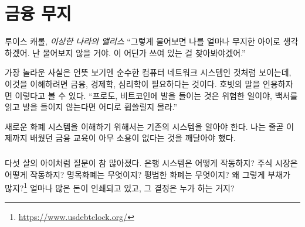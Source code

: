 \chapter{금융 무지}
\label{les:8}

\begin{chapquote}{루이스 캐롤, \textit{이상한 나라의 앨리스}}
\enquote{그렇게 물어보면 나를 얼마나 무지한 아이로 생각하겠어. 난 물어보지 않을 거야. 이 어딘가 쓰여 있는 걸 찾아봐야겠어.}
\end{chapquote}

가장 놀라운 사실은 언뜻 보기엔 순수한 컴퓨터 네트워크 시스템인 것처럼 보이는데,
이것을 이해하려면 금융, 경제학, 심리학이 필요하다는 것이다.
 호빗의 말을 인용하자면 이렇다고 볼 수 있다. 
\enquote{프로도, 비트코인에 발을 
들이는 것은 위험한 일이야, 백서를 읽고 발을 들이지 않는다면 어디로 휩쓸릴지 몰라.}

새로운 화폐 시스템을 이해하기 위해서는 기존의 시스템을 알아야 한다. 
나는 줄곧 이제까지 배웠던 금융 교육이 아무 소용이 없다는 것을 깨달아야 했다.

\paragraph{}
다섯 살의 아이처럼 질문이 참 많아졌다. 
은행 시스템은 어떻게 작동하지? 주식 시장은 어떻게 작동하지? 
명목화폐는 무엇이지? 평범한 화폐는 무엇이지? 왜 그렇게 부채가 많지?\footnote{\url{https://www.usdebtclock.org/}} 
얼마나 많은 돈이 인쇄되고 있고, 그 결정은 누가 하는 거지?

\newpage

